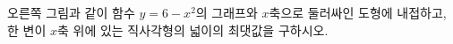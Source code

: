 \noindent\begin{minipage}[t]{0.58\linewidth}\vspace{0pt}\raggedright 오른쪽 그림과 같이 함수 $y=6-x^2$의 그래프와 $x$축으로 둘러싸인 도형에 내접하고, 한 변이 $x$축 위에 있는 직사각형의 넓이의 최댓값을 구하시오.\end{minipage}\hfill\begin{minipage}[t]{0.4\linewidth}\vspace{0pt}\centering \resizebox{\ifdim\width>\linewidth\linewidth\else\width\fi}{!}{}\end{minipage}\par
